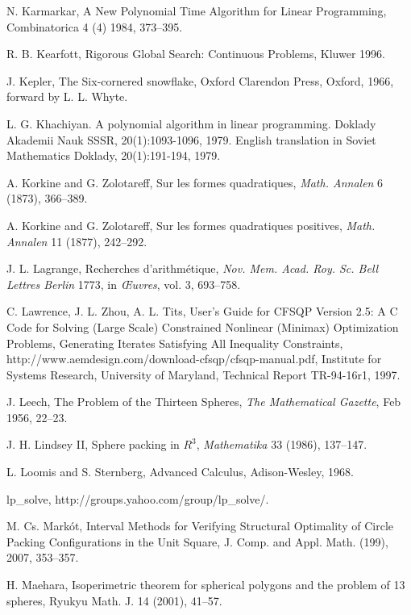 \begin{thebibliography}{CHMS94}
 N. Karmarkar, A New Polynomial Time Algorithm
for Linear Programming, Combinatorica 4 (4) 1984, 373--395.

 R. B. Kearfott, Rigorous Global Search: Continuous
Problems, Kluwer 1996.

 J. Kepler, The Six-cornered snowflake, Oxford Clarendon Press,
    Oxford, 1966,  forward by L. L. Whyte.

 L. G. Khachiyan. A polynomial algorithm in linear programming. Doklady Akademii Nauk SSSR, 20(1):1093-1096, 1979. English translation in Soviet Mathematics Doklady, 20(1):191-194, 1979.

 A. Korkine and  G. Zolotareff, Sur les formes quadratiques,
    {\it Math. Annalen} 6 (1873), 366--389.

 A. Korkine and  G. Zolotareff, Sur les formes quadratiques
    positives, {\it Math. Annalen} 11 (1877), 242--292.

 J. L. Lagrange,  Recherches d'arithm\'etique, {\it Nov. Mem.
    Acad. Roy. Sc. Bell Lettres Berlin} 1773, in {\it \OE uvres}, vol. 3,
    693--758.

 C. Lawrence, J. L. Zhou, A. L. Tits,  User's Guide for CFSQP Version 2.5:
   A C Code for Solving (Large Scale) Constrained Nonlinear (Minimax) Optimization Problems, Generating
   Iterates Satisfying All Inequality Constraints, 
   http://www.aemdesign.com/download-cfsqp/cfsqp-manual.pdf, 
   Institute for Systems Research, University of Maryland, Technical Report TR-94-16r1, 1997.

 J. Leech, The Problem of the Thirteen Spheres,
{\it The Mathematical Gazette}, Feb 1956, 22--23.

 J. H. Lindsey II, Sphere packing in $R^3$, {\it Mathematika}
    33 (1986), 137--147.

 L. Loomis and S. Sternberg, Advanced Calculus, Adison-Wesley, 1968.

 lp\_solve, http://groups.yahoo.com/group/lp\_solve/.

 M. Cs. Mark\'ot, Interval Methods for
Verifying Structural Optimality of Circle Packing Configurations
in the Unit Square,  J. Comp. and Appl. Math. (199),
2007, 353--357.

 H. Maehara, Isoperimetric theorem for spherical
polygons and the problem of 13 spheres, Ryukyu Math. J. 14 (2001), 41--57.


\end{thebibliography}
